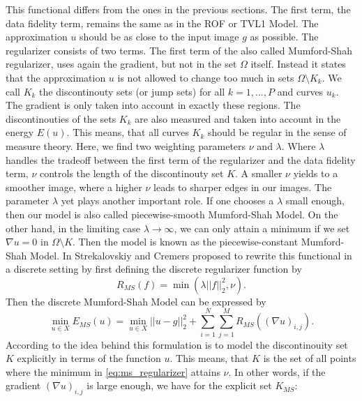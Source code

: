     This functional differs from the ones in the previous sections. The first term, the data fidelity term, remains the same as in the ROF or TVL1 Model. The approximation $u$ should be as close to the input image $g$ as possible. The regularizer consists of two terms. The first term of the also called Mumford-Shah regularizer, uses again the gradient, but not in the set $\Omega$ itself. Instead it states that the approximation $u$ is not allowed to change too much in sets $\Omega \setminus K_{k}$. We call $K_{k}$ the discontinouty sets (or jump sets) for all $k = 1, ..., P$ and curves $u_{k}$. The gradient is only taken into account in exactly these regions. The discontinouties of the sets $K_{k}$ are also measured and taken into account in the energy $E(u)$. This means, that all curves $K_{k}$ should be regular in the sense of measure theory. Here, we find two weighting parameters $\nu$ and $\lambda$. Where $\lambda$ handles the tradeoff between the first term of the regularizer and the data fidelity term, $\nu$ controls the length of the discontinouty set $K$. A smaller $\nu$ yields to a smoother image, where a higher $\nu$ leads to sharper edges in our images. The parameter $\lambda$ yet plays another important role. If one chooses a $\lambda$ small enough, then our model is also called piecewise-smooth Mumford-Shah Model. On the other hand, in the limiting case $\lambda \longrightarrow \infty$, we can only attain a minimum if we set $\nabla u = 0$ in $\Omega \setminus K$. Then the model is known as the piecewise-constant Mumford-Shah Model.
    In \cite{Strekalovskiy-Cremers-eccv14} Strekalovskiy and Cremers proposed to rewrite this functional in a discrete setting by first defining the discrete regularizer function by
        \begin{equation}
            R_{MS}(f) = \min(\lambda||f||_{2}^{2},\nu).
        \label{eq:ms_regularizer}
        \end{equation}
    Then the discrete Mumford-Shah Model can be expressed by
        \begin{equation}
            \min_{u \in X} E_{MS}(u) = \min_{u \in X} ||u - g||_{2}^{2} + \sum_{i = 1}^{N} \sum_{j = 1}^{M} R_{MS}((\nabla u)_{i,j}).
        \label{eq:discrete_mumford_shah_functional}
        \end{equation}
    According to \cite{Strekalovskiy-Cremers-eccv14} the idea behind this formulation is to model the discontinouity set $K$ explicitly in terms of the function $u$. This means, that $K$ is the set of all points where the minimum in \ref{eq:ms_regularizer} attains $\nu$. In other words, if the gradient $(\nabla u)_{i,j}$ is large enough, we have for the explicit set $K_{MS}$:
